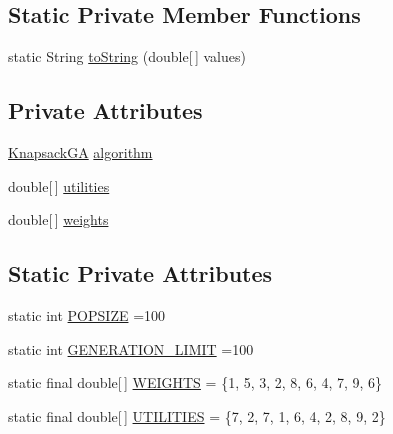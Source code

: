\subsection*{Static Private Member Functions}
\begin{DoxyCompactItemize}
\item 
static String \hyperlink{classjenes_1_1tutorials_1_1old_1_1problem6_1_1_knapsack_problem_a1a81b7b5a0348f42514e6bcb4eef16f9}{to\-String} (double\mbox{[}$\,$\mbox{]} values)
\end{DoxyCompactItemize}
\subsection*{Private Attributes}
\begin{DoxyCompactItemize}
\item 
\hyperlink{classjenes_1_1tutorials_1_1old_1_1problem6_1_1_knapsack_g_a}{Knapsack\-G\-A} \hyperlink{classjenes_1_1tutorials_1_1old_1_1problem6_1_1_knapsack_problem_a1edc8dd12b7c919b2cd06fba8367fba2}{algorithm}
\item 
double\mbox{[}$\,$\mbox{]} \hyperlink{classjenes_1_1tutorials_1_1old_1_1problem6_1_1_knapsack_problem_abc9ec3d0ee0897d7c8a0ed97f3ae82c8}{utilities}
\item 
double\mbox{[}$\,$\mbox{]} \hyperlink{classjenes_1_1tutorials_1_1old_1_1problem6_1_1_knapsack_problem_afdefd7f28bc8f4569e2119d9d7e6d9a7}{weights}
\end{DoxyCompactItemize}
\subsection*{Static Private Attributes}
\begin{DoxyCompactItemize}
\item 
static int \hyperlink{classjenes_1_1tutorials_1_1old_1_1problem6_1_1_knapsack_problem_a489c887a7721761c92cbaf2f1849605b}{P\-O\-P\-S\-I\-Z\-E} =100
\item 
static int \hyperlink{classjenes_1_1tutorials_1_1old_1_1problem6_1_1_knapsack_problem_a062f7b76b5e1a72dce833518466d0bfb}{G\-E\-N\-E\-R\-A\-T\-I\-O\-N\-\_\-\-L\-I\-M\-I\-T} =100
\item 
static final double\mbox{[}$\,$\mbox{]} \hyperlink{classjenes_1_1tutorials_1_1old_1_1problem6_1_1_knapsack_problem_a5b00ed01ddb7bff552617ad4dbc2eda1}{W\-E\-I\-G\-H\-T\-S} = \{1, 5, 3, 2, 8, 6, 4, 7, 9, 6\}
\item 
static final double\mbox{[}$\,$\mbox{]} \hyperlink{classjenes_1_1tutorials_1_1old_1_1problem6_1_1_knapsack_problem_aa91d3e9d3043f7e1644b9ead6b35e48e}{U\-T\-I\-L\-I\-T\-I\-E\-S} = \{7, 2, 7, 1, 6, 4, 2, 8, 9, 2\}
\end{DoxyCompactItemize}


